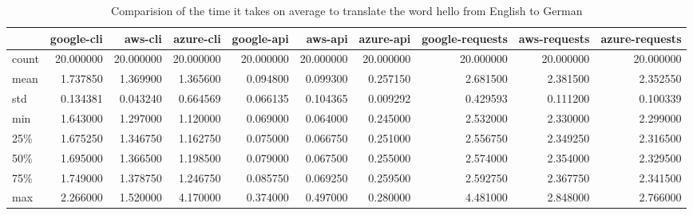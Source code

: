\begin{table}[htb]

\caption{Comparision of the time it takes on average to translate the word hello from English to German}

\begin{tabular}{lrrrrrrrrr}
 & google-cli & aws-cli & azure-cli & google-api & aws-api & azure-api & google-requests & aws-requests & azure-requests \\
 \hline
count & 20.000000 & 20.000000 & 20.000000 & 20.000000 & 20.000000 & 20.000000 & 20.000000 & 20.000000 & 20.000000 \\
mean & 1.737850 & 1.369900 & 1.365600 & 0.094800 & 0.099300 & 0.257150 & 2.681500 & 2.381500 & 2.352550 \\
std & 0.134381 & 0.043240 & 0.664569 & 0.066135 & 0.104365 & 0.009292 & 0.429593 & 0.111200 & 0.100339 \\
min & 1.643000 & 1.297000 & 1.120000 & 0.069000 & 0.064000 & 0.245000 & 2.532000 & 2.330000 & 2.299000 \\
25\% & 1.675250 & 1.346750 & 1.162750 & 0.075000 & 0.066750 & 0.251000 & 2.556750 & 2.349250 & 2.316500 \\
50\% & 1.695000 & 1.366500 & 1.198500 & 0.079000 & 0.067500 & 0.255000 & 2.574000 & 2.354000 & 2.329500 \\
75\% & 1.749000 & 1.378750 & 1.246750 & 0.085750 & 0.069250 & 0.259500 & 2.592750 & 2.367750 & 2.341500 \\
max & 2.266000 & 1.520000 & 4.170000 & 0.374000 & 0.497000 & 0.280000 & 4.481000 & 2.848000 & 2.766000 \\
\hline
\end{tabular}
\end{table}

